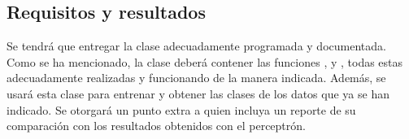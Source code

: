 \subsection{Requisitos y resultados}

Se tendrá que entregar la clase  adecuadamente programada y documentada. Como se ha mencionado, la clase deberá contener las funciones ,  y , todas estas adecuadamente realizadas y funcionando de la manera indicada. Además, se usará esta clase para entrenar y obtener las clases de los datos que ya se han indicado.  Se otorgará un punto extra a quien incluya un reporte de su comparación con los resultados obtenidos con el perceptrón.
